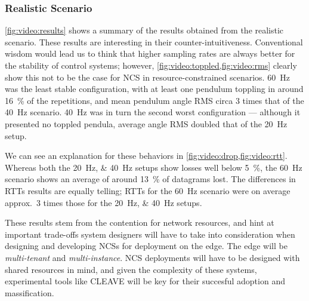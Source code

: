 \subsubsection{Realistic Scenario}

\cref{fig:video:results} shows a summary of the results obtained from the realistic scenario.
These results are interesting in their counter-intuitiveness.
Conventional wisdom would lead us to think that higher sampling rates are always better for the stability of control systems; however, \cref{fig:video:toppled,fig:video:rms} clearly show this not to be the case for \ac{NCS} in resource-constrained scenarios.
\SI{60}{\hertz} was the least stable configuration, with at least one pendulum toppling in around \SI{16}{\percent} of the repetitions, and mean pendulum angle \ac{RMS} circa \num{3} times that of the \SI{40}{\hertz} scenario.
\SI{40}{\hertz} was in turn the second worst configuration --- although it presented no toppled pendula, average angle \ac{RMS} doubled that of the \SI{20}{\hertz} setup.

We can see an explanation for these behaviors in \cref{fig:video:drop,fig:video:rtt}.
Whereas both the \SIlist{20;40}{\hertz} setups show losses well below \SI{5}{\percent}, the \SI{60}{\hertz} scenario shows an average of around \SI{13}{\percent} of datagrams lost.
The differences in \acp{RTT} results are equally telling; \acp{RTT} for the \SI{60}{\hertz} scenario were on average approx.\ \num{3} times those for the \SIlist{20;40}{\hertz} setups.


These results stem from the contention for network resources, and hint at important trade-offs system designers will have to take into consideration when designing and developing \acp{NCS} for deployment on the edge.
The edge will be \emph{multi-tenant} and \emph{multi-instance}. 
\ac{NCS} deployments will have to be designed with shared resources in mind, and given the complexity of these systems, experimental tools like \ac{CLEAVE} will be key for their succesful adoption and massification.

